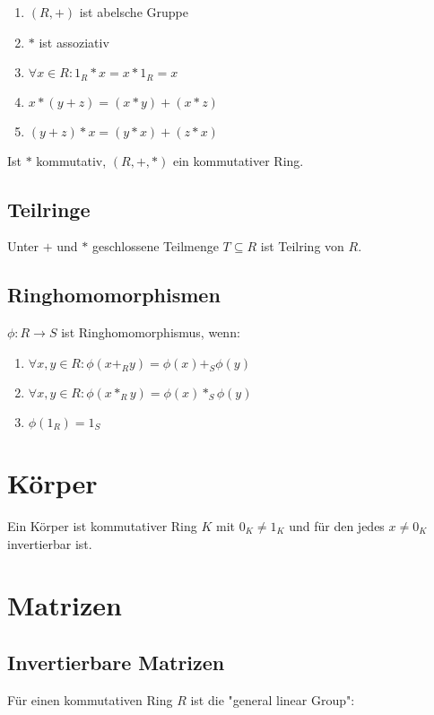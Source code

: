 \begin{enumerate}[label=(\alph*)]
	\item $(R, +)$ ist abelsche Gruppe
	\item $*$ ist assoziativ
	\item $\forall x \in R : 1_R * x = x * 1_R = x$
	\item $x*(y+z) = (x*y)+(x*z)$
	\item $(y+z)*x = (y*x)+(z*x)$
\end{enumerate}

Ist $*$ kommutativ, $(R, +, *)$ ein kommutativer Ring.

\subsection*{Teilringe}

Unter $+$ und $*$ geschlossene Teilmenge $T \subseteq R$ ist Teilring von $R$.

\subsection*{Ringhomomorphismen}

$\phi : R \rightarrow S$ ist Ringhomomorphismus, wenn:

\begin{enumerate}[label=(\alph*)]
	\item $\forall x, y \in R : \phi(x +_R y) = \phi(x) +_S \phi(y)$
	\item $\forall x, y \in R : \phi(x *_R y) = \phi(x) *_S \phi(y)$
	\item $\phi(1_R) = 1_S$
\end{enumerate}

\section*{Körper}

Ein Körper ist kommutativer Ring $K$ mit $0_K \neq 1_K$ und für den jedes $x \neq 0_K$ invertierbar ist.

\section*{Matrizen}

\subsection*{Invertierbare Matrizen}

Für einen kommutativen Ring $R$ ist die "general linear Group":

